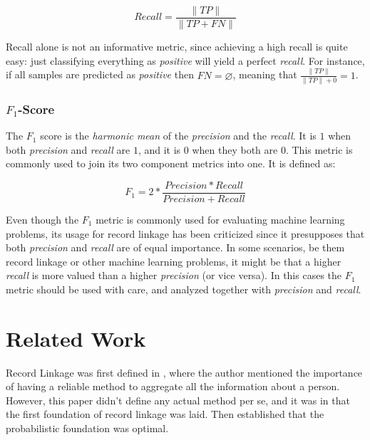 \documentclass[epsfig,a4paper,11pt,titlepage,twoside,openany]{book}
\begin{document}
$$
Recall = \frac{\|TP\|}{\|TP + FN\|}
$$

Recall alone is not an informative metric, since achieving a high recall is
quite easy: just classifying everything as \textit{positive} will yield a
perfect \textit{recall}. For instance, if all samples are predicted as \textit{positive} then $FN = \varnothing$, meaning that $\frac{\|TP\|}{\|TP\| + 0} = 1$.



\subsubsection{$F_1$-Score}
\label{sec:evaluation-metric-f1}

The $F_1$ score is the \textit{harmonic mean} of the \textit{precision} and the
\textit{recall}. It is $1$ when both \textit{precision} and \textit{recall} are
$1$, and it is $0$ when they both are $0$. This metric is commonly used to join
its two component metrics into one. It is defined as:

$$
F_1 = 2 * \frac{Precision * Recall}{Precision + Recall}
$$

Even though the $F_1$ metric is commonly used for evaluating machine learning problems, its usage for record linkage has been criticized \cite{hand17_note_using_f_measur_evaluat} since it presupposes that both \textit{precision} and \textit{recall} are of equal importance. In some scenarios, be them record linkage or other machine learning problems, it might be that a higher \textit{recall} is more valued than a higher \textit{precision} (or vice versa). In this cases the $F_1$ metric should be used with care, and analyzed together with \textit{precision} and \textit{recall}. 



\section{Related Work}
\label{sec:rl-related-work}


Record Linkage was first defined in \cite{dunn46_recor_linkag}, where the author
mentioned the importance of having a reliable method to aggregate all the
information about a person. However, this paper didn't define any actual method
per se, and it was in \cite{newcombe59_autom_linkag_vital_recor} that the first
foundation of record linkage was laid. Then \cite{fellegi69_theor_recor_linkag}
established that the probabilistic foundation was optimal. 
\end{document}

